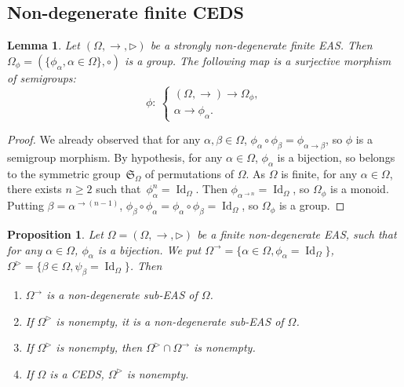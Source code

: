 \documentclass[pdftex]{sigma}
\numberwithin{equation}{section}
\newtheorem{Lemma}[Theorem]{Lemma}
\newtheorem{Proposition}[Theorem]{Proposition}
 { \theoremstyle{definition}
\newtheorem{Definition}[Theorem]{Definition}
\newtheorem{Note}[Theorem]{Note}
\newtheorem{Example}[Theorem]{Example}
\newtheorem{Remark}[Theorem]{Remark}
\newtheorem{Notation}[Theorem]{Notation}}
\begin{document}
\subsection{Non-degenerate finite CEDS}

\begin{Lemma}\label{lem3.9}
Let $(\Omega,\rightarrow,\triangleright)$ be a strongly non-degenerate finite EAS. Then $\Omega_\phi=(\{\phi_\alpha, \alpha\in \Omega\},\circ)$ is a group. The following map is a surjective morphism of semigroups:
\[\phi\colon \ \begin{cases}
(\Omega,\rightarrow) \longrightarrow \Omega_\phi,\\
\alpha \longrightarrow \phi_\alpha.
\end{cases}\]
\end{Lemma}

\begin{proof}
We already observed that for any $\alpha,\beta \in \Omega$, $\phi_\alpha\circ \phi_\beta=\phi_{\alpha\rightarrow \beta}$, so $\phi$ is a semigroup morphism.
By hypothesis, for any $\alpha \in \Omega$, $\phi_\alpha$ is a bijection, so belongs to the symmetric group~$\mathfrak{S}_\Omega$ of permutations of $\Omega$.
As $\Omega$ is finite, for any $\alpha \in \Omega$, there exists $n\geqslant 2$ such that~${\phi_\alpha^n=\operatorname{Id}_\Omega}$.
Then $\phi_{\alpha^{\rightarrow n}}=\operatorname{Id}_\Omega$, so $\Omega_\phi$ is a monoid. Putting $\beta=\alpha^{\rightarrow(n-1)}$, $\phi_\beta\circ \phi_\alpha=\phi_\alpha\circ \phi_\beta=\operatorname{Id}_\Omega$, so $\Omega_\phi$ is a group.
\end{proof}

\begin{Proposition}\label{prop3.10}
Let $\Omega=(\Omega,\rightarrow,\triangleright)$ be a finite non-degenerate EAS, such that for any $\alpha \in \Omega$, $\phi_\alpha$ is a bijection. We put
$
\Omega^\rightarrow=\{\alpha\in \Omega, \phi_\alpha=\operatorname{Id}_\Omega\}$, $\Omega^\triangleright =\{\beta \in \Omega, \psi_\beta=\operatorname{Id}_\Omega\}$.
Then
\begin{enumerate}\itemsep=0pt
\item[$(1)$] $\Omega^\rightarrow$ is a non-degenerate sub-EAS of $\Omega$.
\item[$(2)$] If $\Omega^\triangleright$ is nonempty, it is a non-degenerate sub-EAS of $\Omega$.
\item[$(3)$] If $\Omega^\triangleright$ is nonempty, then $\Omega^\triangleright \cap \Omega^\rightarrow$ is nonempty.
\item[$(4)$] If $\Omega$ is a CEDS, $\Omega^\triangleright$ is nonempty.
\end{enumerate}\end{Proposition}
\end{document}
